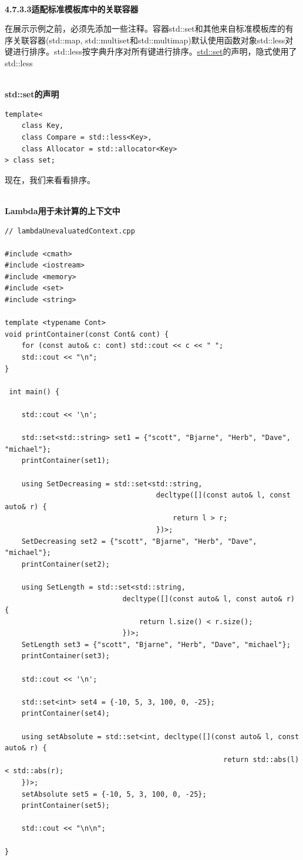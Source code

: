 \hspace*{\fill} \\ %
\noindent
\textbf{4.7.3.3\hspace{0.2cm}适配标准模板库中的关联容器}

在展示示例之前，必须先添加一些注释。容器std::set和其他来自标准模板库的有序关联容器(std::map, std::multiset和std::multimap)默认使用函数对象std::less对键进行排序。std::less按字典升序对所有键进行排序。\href{https://en.cppreference.com/w/cpp/container/set}{std::set}的声明，隐式使用了std::less

\hspace*{\fill} \\ %
\noindent
\textbf{std::set的声明}
\begin{lstlisting}[style=styleCXX]
template<
	class Key,
	class Compare = std::less<Key>,
	class Allocator = std::allocator<Key>
> class set;
\end{lstlisting}

现在，我们来看看排序。

\hspace*{\fill} \\ %
\noindent
\textbf{Lambda用于未计算的上下文中}
\begin{lstlisting}[style=styleCXX]
// lambdaUnevaluatedContext.cpp

#include <cmath>
#include <iostream>
#include <memory>
#include <set>
#include <string>

template <typename Cont>
void printContainer(const Cont& cont) {
	for (const auto& c: cont) std::cout << c << " ";
	std::cout << "\n";
}

 int main() {
	
	std::cout << '\n';
	
	std::set<std::string> set1 = {"scott", "Bjarne", "Herb", "Dave", "michael"};
	printContainer(set1);
	
	using SetDecreasing = std::set<std::string,
									decltype([](const auto& l, const auto& r) {
	 									return l > r;
									})>;
	SetDecreasing set2 = {"scott", "Bjarne", "Herb", "Dave", "michael"};
	printContainer(set2);
	
	using SetLength = std::set<std::string,
							decltype([](const auto& l, const auto& r) {
	 							return l.size() < r.size();
							})>;
	SetLength set3 = {"scott", "Bjarne", "Herb", "Dave", "michael"};
	printContainer(set3);
	
	std::cout << '\n';
	
	std::set<int> set4 = {-10, 5, 3, 100, 0, -25};
	printContainer(set4);
	
	using setAbsolute = std::set<int, decltype([](const auto& l, const auto& r) {
	 												return std::abs(l)< std::abs(r);
	})>;
	setAbsolute set5 = {-10, 5, 3, 100, 0, -25};
	printContainer(set5);
	
	std::cout << "\n\n";

}
\end{lstlisting}

